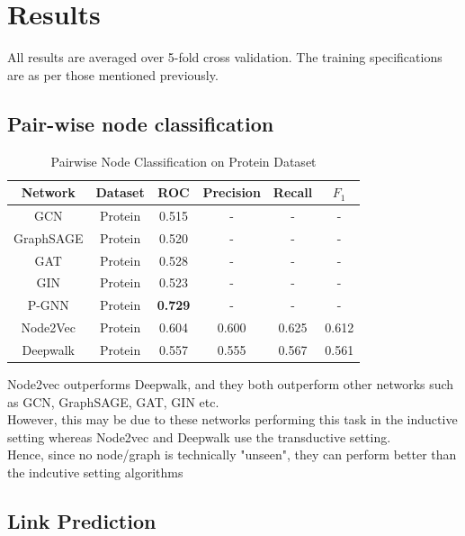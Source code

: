 \documentclass[sigconf]{acmart}
\begin{document}
\section{Results}

All results are averaged over 5-fold cross validation. The training specifications are as per those mentioned previously.

\subsection{Pair-wise node classification}

\begin{table}[h]
\begin{center}
\begin{tabular}{ c|c|c|c|c|c } 
 \textbf{Network} & \textbf{Dataset} & \textbf{ROC} & \textbf{Precision} & \textbf{Recall} & \textbf{$F_{1}$} \\ 
 \hline
 GCN\cite{kipf2016semi} & Protein &  0.515 & - & - & - \\
 GraphSAGE\cite{hamilton2017inductive} & Protein & 0.520 & - & - & - \\
 GAT\cite{velivckovic2017graph} & Protein &  0.528 & - & - & - \\
 GIN\cite{wang2019knowledge} & Protein & 0.523 & - & - & - \\
 P-GNN\cite{you2019position} & Protein & \textbf{0.729} & - & - & - \\
 \hline
 Node2Vec\cite{node2vec-kdd2016} & Protein & 0.604 & 0.600 & 0.625 & 0.612  \\ 
 Deepwalk\cite{Perozzi:2014:DOL:2623330.2623732} & Protein & 0.557 & 0.555 & 0.567 & 0.561

\end{tabular}
\end{center}
\caption{Pairwise Node Classification on Protein Dataset}
\label{tab:res1}
\end{table}

Node2vec outperforms Deepwalk, and they both outperform other networks such as GCN, GraphSAGE, GAT, GIN etc. \\
However, this may be due to these networks performing this task in the inductive setting whereas Node2vec and Deepwalk use the transductive setting. \\
Hence, since no node/graph is technically "unseen", they can perform better than the indcutive setting algorithms


\subsection{Link Prediction}
\end{document}
